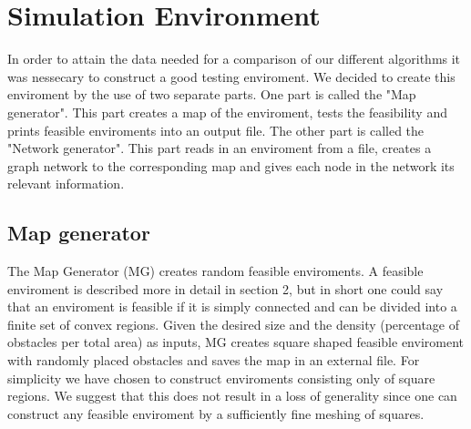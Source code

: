 	
\chapter{Simulation Environment}
In order to attain the data needed for a comparison of our different algorithms it was nessecary to construct a good testing enviroment. We decided to create this enviroment by the use of two separate parts. One part is called the "Map generator". This part creates a map of the enviroment, tests the feasibility and prints feasible enviroments into an output file. The other part is called the "Network generator". This part reads in an enviroment from a file, creates a graph network to the corresponding map and gives each node in the network its relevant information.\\

\section{Map generator}
The Map Generator (MG) creates random feasible enviroments. A feasible enviroment is described more in detail in section 2, but in short one could say that an enviroment is feasible if it is simply connected and can be divided into a finite set of convex regions. Given the desired size and the density (percentage of obstacles per total area) as inputs, MG creates square shaped feasible enviroment with randomly placed obstacles and saves the map in an external file. For simplicity we have chosen to construct enviroments consisting only of square regions. We suggest that this does not result in a loss of generality since one can construct any feasible enviroment by a sufficiently fine meshing of squares. \\

